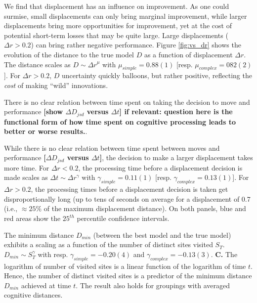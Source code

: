 We find that displacement has an influence on improvement. As one could surmise, small displacements can only bring marginal improvement, while larger displacements bring more opportunities for improvement, yet at the cost of potential short-term losses that may be quite large. Large displacements ($\Delta r > 0.2$) can bring rather negative performance. Figure \ref{fig:vs_dr} shows the evolution of the distance to the true model $D$ as a function of displacement $\Delta r$. The distance scales as $D \sim {\Delta r}^{\mu}$ with $\mu_{simple} = 0.88(1)$ [resp. $\mu_{complex} = 082(2)$]. For $\Delta r > 0.2$, $D$ uncertainty quickly balloons, but rather positive, reflecting the {\it cost} of making ``wild'' innovations. 

There is no clear relation between time spent on taking the decision to move and performance {\bf [show $\Delta D_{jsd}$ versus $\Delta t$] if relevant: question here is the functional form of how time spent on cognitive processing leads to better or worse results.}.

While there is no clear relation between time spent between moves and performance {\bf [$\Delta D_{jsd}$ versus $\Delta t$]}, the decision to make a larger displacement takes more time. For $\Delta r < 0.2$, the processing time before a displacement decision is made scales as $\Delta t \sim \Delta r^{\gamma}$ with $\gamma_{simple} = 0.11(1)$ [resp. $\gamma_{complex} = 0.13(1)$]. For $\Delta r > 0.2$, the processing times before a displacement decision is taken get disproportionally long (up to tens of seconds on average for a displacement of 0.7 (i.e., $\approx 25\%$ of the maximum displacement distance). On both panels, blue and red areas show the $25^{th}$ percentile confidence intervals.

The minimum distance $D_{min}$ (between the best model and the true model) exhibits a scaling as a function of the number of distinct sites visited $S_{T}$. $D_{min} \sim S_{T}^{\gamma}$ with resp. $\gamma_{simple} = -0.20(4)$ and $\gamma_{complex} = - 0.13(3)$. {\bf C.} The logarithm of number of visited sites is a linear function of the logarithm of time $t$. Hence, the number of distinct visited sites is a predictor of the minimum distance $D_{min}$ achieved at time $t$. The result also holds for groupings with averaged cognitive distances.


